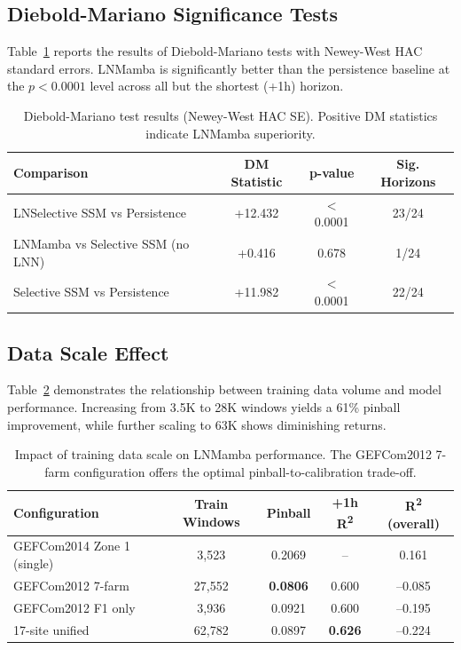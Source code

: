 \documentclass[review]{elsarticle}
\begin{document}
\subsection{Diebold-Mariano Significance Tests}

Table~\ref{tab:dm} reports the results of Diebold-Mariano tests with Newey-West HAC standard errors. LNMamba is significantly better than the persistence baseline at the $p < 0.0001$ level across all but the shortest (+1h) horizon.

\begin{table}[H]
\centering
\caption{Diebold-Mariano test results (Newey-West HAC SE). Positive DM statistics indicate LNMamba superiority.}
\label{tab:dm}
\begin{tabular}{@{}lccc@{}}
\toprule
\textbf{Comparison} & \textbf{DM Statistic} & \textbf{p-value} & \textbf{Sig. Horizons} \\
\midrule
LNSelective SSM vs Persistence & +12.432 & $<$0.0001 & 23/24 \\
LNMamba vs Selective SSM (no LNN) & +0.416 & 0.678 & 1/24 \\
Selective SSM vs Persistence & +11.982 & $<$0.0001 & 22/24 \\
\bottomrule
\end{tabular}
\end{table}

\subsection{Data Scale Effect}

Table~\ref{tab:scale} demonstrates the relationship between training data volume and model performance. Increasing from 3.5K to 28K windows yields a 61\% pinball improvement, while further scaling to 63K shows diminishing returns.

\begin{table}[H]
\centering
\caption{Impact of training data scale on LNMamba performance. The GEFCom2012 7-farm configuration offers the optimal pinball-to-calibration trade-off.}
\label{tab:scale}
\begin{tabular}{@{}lcccc@{}}
\toprule
\textbf{Configuration} & \textbf{Train Windows} & \textbf{Pinball} & \textbf{+1h R\textsuperscript{2}} & \textbf{R\textsuperscript{2} (overall)} \\
\midrule
GEFCom2014 Zone 1 (single) & 3,523 & 0.2069 & -- & 0.161 \\
GEFCom2012 7-farm & 27,552 & \textbf{0.0806} & 0.600 & --0.085 \\
GEFCom2012 F1 only & 3,936 & 0.0921 & 0.600 & --0.195 \\
17-site unified & 62,782 & 0.0897 & \textbf{0.626} & --0.224 \\
\bottomrule
\end{tabular}
\end{table}
\end{document}
